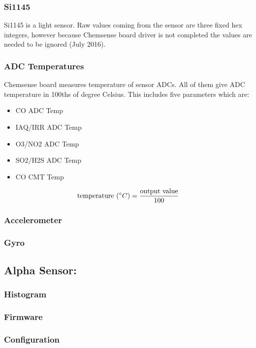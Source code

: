 \subsubsection{ Si1145}

Si1145 is a light sensor. Raw values coming from the sensor are three fixed hex integers, however because Chemsense board driver is not completed the values are needed to be ignored (July 2016).

\subsubsection{ ADC Temperatures}
Chemsense board measures temperature of sensor ADCs. All of them give ADC temperature in 100ths of degree Celsius. This includes five parameters which are:
 
\begin{itemize}
  \item CO ADC Temp
  \item IAQ/IRR ADC Temp
  \item O3/NO2 ADC Temp
  \item SO2/H2S ADC Temp
  \item CO CMT Temp
\end{itemize}


{\centering 
 \[ \text{temperature }(\degree C) = \frac{\text{output value}}{100} \]
}

\subsubsection{ Accelerometer}

\subsubsection{ Gyro}

\bigbreak
\subsection{Alpha Sensor:}
\subsubsection{ Histogram}

\subsubsection{ Firmware}

\subsubsection{ Configuration}